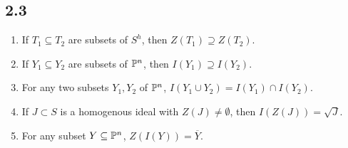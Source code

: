 \subsection*{2.3}

\begin{enumerate}
    \item If $T_1 \subseteq T_2$ are subsets of $S^h$, then $Z(T_1) \supseteq Z(T_2)$.
    \item If $Y_1 \subseteq Y_2$ are subsets of $\P^n$, then $I(Y_1) \supseteq I(Y_2)$.
    \item For any two subsets $Y_1, Y_2$ of $\P^n$, $I(Y_1 \cup Y_2) = I(Y_1) \cap I(Y_2)$.
    \item If $J \subset S$ is a homogenous ideal with $Z(J) \neq \emptyset$, then $I(Z(J)) = \sqrt{J}$.
    \item For any subset $Y \subseteq \P^n$, $Z(I(Y)) = \overline{Y}$.
\end{enumerate}